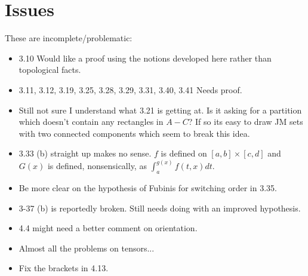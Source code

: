 \documentclass[20pt]{article}
\theoremstyle{plain}
\theoremstyle{definition}
\begin{document}
  

















































































\section{Issues}

These are incomplete/problematic:
\begin{itemize}
  \item 3.10 Would like a proof using the notions developed here rather than 
  topological facts.
  \item 3.11, 3.12, 3.19, 3.25, 3.28, 3.29, 3.31, 3.40, 3.41 Needs proof.
  \item Still not sure I understand what 3.21 is getting at.  Is it asking for a partition 
  which doesn't contain any rectangles in $A-C$? If so its easy to 
  draw JM sets with two connected components which seem to break this idea.
  \item 3.33 (b) straight up makes no sense. $f$ is defined on $[a, b] \times [c, d]$
  and $G(x)$ is defined, nonsensically, as $\int_a^{g(x)}f(t, x)dt$.
  \item Be more clear on the hypothesis of Fubinis for switching order in 3.35.
  \item 3-37 (b) is reportedly broken. Still needs doing with an improved 
  hypothesis.
  \item 4.4 might need a better comment on orientation.
  \item Almost all the problems on tensors...
  \item Fix the brackets in 4.13.
\end{itemize}
\end{document}
